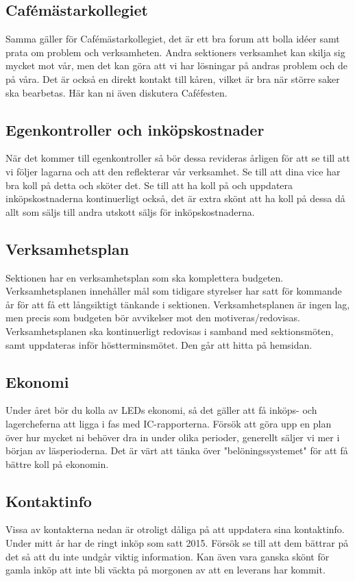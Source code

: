 \documentclass[10pt]{article}
\begin{document}
\subsection{Cafémästarkollegiet}
Samma gäller för Cafémästarkollegiet, det är ett bra forum att bolla idéer samt prata om problem och verksamheten. Andra sektioners verksamhet kan skilja sig mycket mot vår, men det kan göra att vi har lösningar på andras problem och de på våra. Det är också en direkt kontakt till kåren, vilket är bra när större saker ska bearbetas. Här kan ni även diskutera Caféfesten.

\subsection{Egenkontroller och inköpskostnader}
När det kommer till egenkontroller så bör dessa revideras årligen för att se till att vi följer lagarna och att den reflekterar vår verksamhet. Se till att dina vice har bra koll på detta och sköter det.
Se till att ha koll på och uppdatera inköpskostnaderna kontinuerligt också, det är extra skönt att ha koll på dessa då allt som säljs till andra utskott säljs för inköpskostnaderna.

\subsection{Verksamhetsplan}
Sektionen har en verksamhetsplan som ska komplettera budgeten. Verksamhetsplanen innehåller mål som tidigare styrelser har satt för kommande år för att få ett långsiktigt tänkande i sektionen. Verksamhetsplanen är ingen lag, men precis som budgeten bör avvikelser mot den motiveras/redovisas. Verksamhetsplanen ska kontinuerligt redovisas i samband med sektionsmöten, samt uppdateras inför höstterminsmötet. Den går att hitta på hemsidan.

\subsection{Ekonomi}
Under året bör du kolla av LEDs ekonomi, så det gäller att få inköps- och lagercheferna att ligga i fas med IC-rapporterna. Försök att göra upp en plan över hur mycket ni behöver dra in under olika perioder, generellt säljer vi mer i början av läsperioderna. Det är värt att tänka över "belöningssystemet" för att få bättre koll på ekonomin.

\subsection{Kontaktinfo}
Vissa av kontakterna nedan är otroligt dåliga på att uppdatera sina kontaktinfo. Under mitt år har de ringt inköp som satt 2015. Försök se till att dem bättrar på det så att du inte undgår viktig information. Kan även vara ganska skönt för gamla inköp att inte bli väckta på morgonen av att en leverans har kommit.
\end{document}
